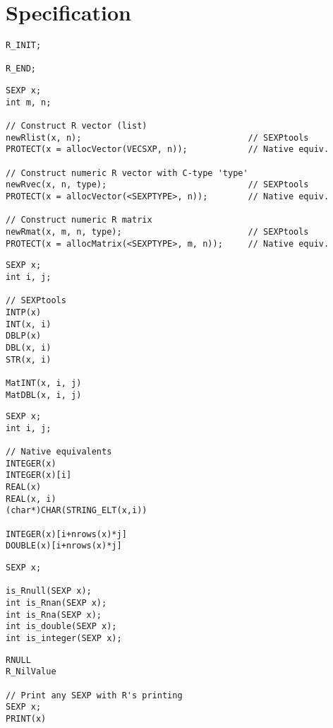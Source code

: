 \section{Specification}\label{specification}

\begin{lstlisting}[language=fanC,title=GC Counter]
R_INIT;

R_END;
\end{lstlisting}


\begin{lstlisting}[language=fanC,title=Allocation]
SEXP x;
int m, n;

// Construct R vector (list)
newRlist(x, n);                                 // SEXPtools
PROTECT(x = allocVector(VECSXP, n));            // Native equiv.

// Construct numeric R vector with C-type 'type'
newRvec(x, n, type);                            // SEXPtools
PROTECT(x = allocVector(<SEXPTYPE>, n));        // Native equiv.

// Construct numeric R matrix
newRmat(x, m, n, type);                         // SEXPtools
PROTECT(x = allocMatrix(<SEXPTYPE>, m, n));     // Native equiv.
\end{lstlisting}


\begin{center}
\begin{minipage}{.485\textwidth}\centering
\begin{lstlisting}[language=fanC,title=Data Accessors]
SEXP x;
int i, j;

// SEXPtools
INTP(x)
INT(x, i)
DBLP(x)
DBL(x, i) 
STR(x, i)

MatINT(x, i, j)
MatDBL(x, i, j) 
\end{lstlisting}
\end{minipage}
\hspace{.2cm}
\begin{minipage}{.485\textwidth}\centering
\begin{lstlisting}[language=fanC,title=Data Accessors]
SEXP x;
int i, j;

// Native equivalents
INTEGER(x)
INTEGER(x)[i]
REAL(x)
REAL(x, i)
(char*)CHAR(STRING_ELT(x,i))

INTEGER(x)[i+nrows(x)*j]
DOUBLE(x)[i+nrows(x)*j]
\end{lstlisting}
\end{minipage}
\end{center}


\begin{lstlisting}[language=fanC,title=Testers]
SEXP x;

is_Rnull(SEXP x);
int is_Rnan(SEXP x);
int is_Rna(SEXP x);
int is_double(SEXP x);
int is_integer(SEXP x);
\end{lstlisting}


\begin{lstlisting}[language=fanC,title=Misc]
RNULL
R_NilValue

// Print any SEXP with R's printing
SEXP x;
PRINT(x)
\end{lstlisting}


